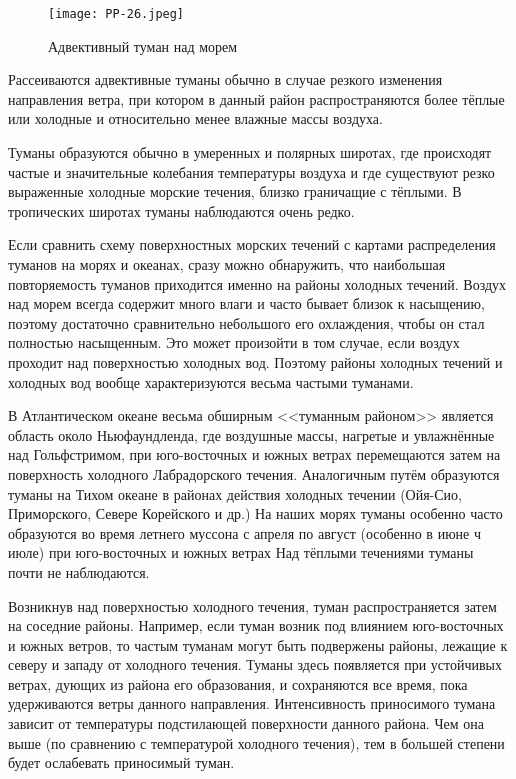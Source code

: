 \begin{figure}[htb]
  \centering{}
  \texttt{[image: PP-26.jpeg]}
  \caption{Адвективный туман над морем}
  \label{fig:pp26}
  \small
  \centering{}
\end{figure}

Рассеиваются адвективные туманы обычно в случае резкого изменения
направления ветра, при котором в данный район распространяются более
тёплые или холодные и относительно менее влажные массы воздуха.

Туманы образуются обычно в умеренных и полярных широтах, где
происходят частые и значительные колебания температуры воздуха и где
существуют резко выраженные холодные морские течения, близко
граничащие с тёплыми. В тропических широтах туманы наблюдаются очень
редко.

Если сравнить схему поверхностных морских течений с картами
распределения туманов на морях и океанах, сразу можно обнаружить, что
наибольшая повторяемость туманов приходится именно на районы холодных
течений. Воздух над морем всегда содержит много влаги и часто бывает
близок к насыщению, поэтому достаточно сравнительно небольшого его
охлаждения, чтобы он стал полностью насыщенным. Это может произойти в
том случае, если воздух проходит над поверхностью холодных вод. Поэтому
районы холодных течений и холодных вод вообще характеризуются весьма
частыми туманами.

В Атлантическом океане весьма обширным <<туманным районом>> является
область около Ньюфаундленда, где воздушные массы, нагретые и
увлажнённые над Гольфстримом, при юго-восточных и южных ветрах
перемещаются затем на поверхность холодного Лабрадорского
течения. Аналогичным путём образуются туманы на Тихом океане в районах
действия холодных течении (Ойя-Сио, Приморского, Севере Корейского и
др.) На наших морях туманы особенно часто образуются во время летнего
муссона с апреля по август (особенно в июне ч июле) при юго-восточных
и южных ветрах Над тёплыми течениями туманы почти не наблюдаются.

Возникнув над поверхностью холодного течения, туман распространяется
затем на соседние районы. Например, если туман возник под влиянием
юго-восточных и южных ветров, то частым туманам могут быть подвержены
районы, лежащие к северу и западу от холодного течения. Туманы здесь
появляется при устойчивых ветрах, дующих из района его образования, и
сохраняются все время, пока удерживаются ветры данного
направления. Интенсивность приносимого тумана зависит от температуры
подстилающей поверхности данного района. Чем она выше (по сравнению с
температурой холодного течения), тем в большей степени будет
ослабевать приносимый туман.

